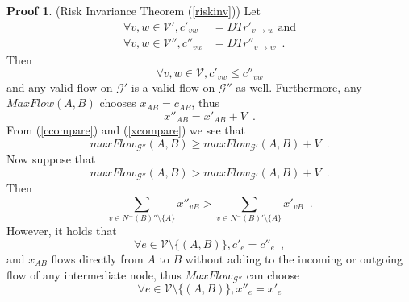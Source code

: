 \documentclass[11pt]{llncs}
\theoremstyle{definition}
\newtheorem{sepproof}{Proof}
\begin{document}
     \begin{sepproof} (Risk Invariance Theorem (\ref{riskinv}))
        Let
        \begin{align}
           \forall v,w \in \mathcal{V}', c'_{vw} &= DTr'_{v \rightarrow w} \mbox{ and} \\
           \forall v,w \in \mathcal{V}'', c''_{vw} &= DTr''_{v \rightarrow w} \enspace.
        \end{align}
        Then
        \begin{equation}
        \label{ccompare}
           \forall v, w \in \mathcal{V}, c'_{vw} \leq c''_{vw}
        \end{equation}
        and any valid flow on $\mathcal{G}'$ is a valid flow on $\mathcal{G}''$ as well. Furthermore, any
        $MaxFlow\left(A, B\right)$ chooses $x_{AB} = c_{AB}$, thus
        \begin{equation}
        \label{xcompare}
           x''_{AB} = x'_{AB} + V \enspace.
        \end{equation}
        From (\ref{ccompare}) and (\ref{xcompare}) we see that
        \begin{equation}
        \label{doublebigger}
           maxFlow_{\mathcal{G}''}\left(A, B\right) \geq maxFlow_{\mathcal{G}'}\left(A, B\right) + V \enspace.
        \end{equation}
        Now suppose that
        \begin{equation}
        \label{mfsupposition}
           maxFlow_{\mathcal{G}''}\left(A, B\right) > maxFlow_{\mathcal{G}'}\left(A, B\right) + V \enspace.
        \end{equation}
        Then 
        \begin{equation}
           \sum\limits_{v \in N^{-}\left(B\right)'' \setminus \{A\}}x''_{vB} > \sum\limits_{v \in N^{-}\left(B\right)'
           \setminus \{A\}}x'_{vB} \enspace.
        \end{equation}
        However, it holds that
        \begin{equation}
        \label{cequal}
           \forall e \in \mathcal{V} \setminus \{\left(A, B\right)\}, c'_e = c''_e \enspace,
        \end{equation}
        and $x_{AB}$ flows directly from $A$ to $B$ without adding to the incoming or outgoing flow of any intermediate node,
        thus $MaxFlow_{\mathcal{G}''}$ can choose
        \begin{equation}
           \forall e \in \mathcal{V} \setminus \{\left(A, B\right)\}, x''_e = x'_e
        \end{equation}

\end{sepproof}
\end{document}
